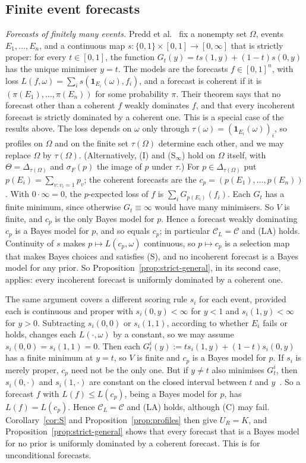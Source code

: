 \documentclass[11pt]{article}
\theoremstyle{definition}
\theoremstyle{remark}
\newcommand{\C}{\mathcal C}
\newcommand{\one}{\mathbf 1}
\begin{document}
\subsection{Finite event forecasts}\label{sec:forecasts}
\emph{Forecasts of finitely many events.} Predd et al.~\cite[Theorem~1]{Predd} fix a nonempty set $\Omega$, events $E_1,\dots,E_n$, and a continuous map $s:\{0,1\}\times[0,1]\to[0,\infty]$ that is strictly proper: for every $t\in[0,1]$, the function $G_t(y)=ts(1,y)+(1-t)s(0,y)$ has the unique minimiser $y=t$. The models are the forecasts $f\in[0,1]^n$, with loss $L(f,\omega)=\sum_is(\one_{E_i}(\omega),f_i)$, and a forecast is coherent if it is $(\pi(E_1),\dots,\pi(E_n))$ for some probability $\pi$. Their theorem says that no forecast other than a coherent $f$ weakly dominates $f$, and that every incoherent forecast is strictly dominated by a coherent one. This is a special case of the results above. The loss depends on $\omega$ only through $\tau(\omega)=(\one_{E_i}(\omega))_i$, so profiles on $\Omega$ and on the finite set $\tau(\Omega)$ determine each other, and we may replace $\Omega$ by $\tau(\Omega)$. (Alternatively, (I) and (S$_\infty$) hold on $\Omega$ itself, with $\Theta=\Delta_{\tau(\Omega)}$ and $\sigma_F(p)$ the image of $p$ under $\tau$.) For $p\in\Delta_{\tau(\Omega)}$ put $p(E_i)=\sum_{v:v_i=1}p_v$; the coherent forecasts are the $c_p=(p(E_1),\dots,p(E_n))$. With $0\cdot\infty=0$, the $p$-expected loss of $f$ is $\sum_iG_{p(E_i)}(f_i)$. Each $G_t$ has a finite minimum, since otherwise $G_t\equiv\infty$ would have many minimisers. So $V$ is finite, and $c_p$ is the only Bayes model for $p$. Hence a forecast weakly dominating $c_p$ is a Bayes model for $p$, and so equals $c_p$; in particular $\C_L=\C$ and (LA) holds. Continuity of $s$ makes $p\mapsto L(c_p,\omega)$ continuous, so $p\mapsto c_p$ is a selection map that makes Bayes choices and satisfies (S), and no incoherent forecast is a Bayes model for any prior. So Proposition~\ref{prop:strict-general}, in its second case, applies: every incoherent forecast is uniformly dominated by a coherent one.

The same argument covers a different scoring rule $s_i$ for each event, provided each is continuous and proper with $s_i(0,y)<\infty$ for $y<1$ and $s_i(1,y)<\infty$ for $y>0$. Subtracting $s_i(0,0)$ or $s_i(1,1)$, according to whether $E_i$ fails or holds, changes each $L(\cdot,\omega)$ by a constant, so we may assume $s_i(0,0)=s_i(1,1)=0$. Then each $G^i_t(y):=ts_i(1,y)+(1-t)s_i(0,y)$ has a finite minimum at $y=t$, so $V$ is finite and $c_p$ is a Bayes model for $p$. If $s_i$ is merely proper, $c_p$ need not be the only one. But if $y\ne t$ also minimises $G^i_t$, then $s_i(0,\cdot)$ and $s_i(1,\cdot)$ are constant on the closed interval between $t$ and $y$~\cite[Lemma~5]{SSK09}. So a forecast $f$ with $L(f)\le L(c_p)$, being a Bayes model for $p$, has $L(f)=L(c_p)$. Hence $\C_L=\C$ and (LA) holds, although (C) may fail. Corollary~\ref{cor:S} and Proposition~\ref{prop:profiles} then give $U_R=K$, and Proposition~\ref{prop:strict-general} shows that every forecast that is a Bayes model for no prior is uniformly dominated by a coherent forecast. This is \cite[Theorem~2, Conclusion~3]{SSK09} for unconditional forecasts.
\end{document}
